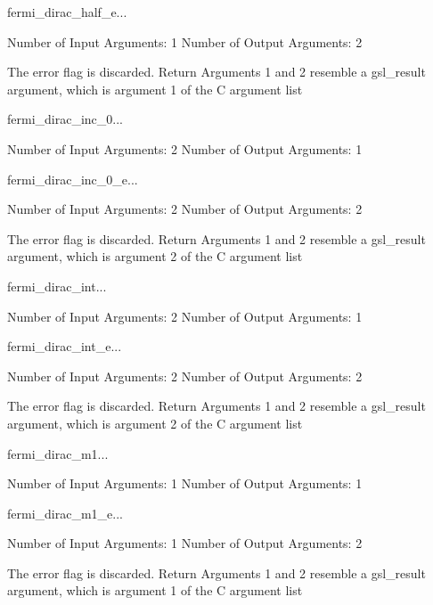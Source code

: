 \begin{funcdesc}{fermi_dirac_half_e}{...}

    Number of Input  Arguments:  1
    Number of Output Arguments:  2

The error flag is discarded.
Return Arguments 1 and 2 resemble a gsl_result argument,
	which is  argument 1 of the C argument list

\end{funcdesc}

\begin{funcdesc}{fermi_dirac_inc_0}{...}

    Number of Input  Arguments:  2
    Number of Output Arguments:  1
\end{funcdesc}

\begin{funcdesc}{fermi_dirac_inc_0_e}{...}

    Number of Input  Arguments:  2
    Number of Output Arguments:  2

The error flag is discarded.
Return Arguments 1 and 2 resemble a gsl_result argument,
	which is  argument 2 of the C argument list

\end{funcdesc}

\begin{funcdesc}{fermi_dirac_int}{...}

    Number of Input  Arguments:  2
    Number of Output Arguments:  1
\end{funcdesc}

\begin{funcdesc}{fermi_dirac_int_e}{...}

    Number of Input  Arguments:  2
    Number of Output Arguments:  2

The error flag is discarded.
Return Arguments 1 and 2 resemble a gsl_result argument,
	which is  argument 2 of the C argument list

\end{funcdesc}

\begin{funcdesc}{fermi_dirac_m1}{...}

    Number of Input  Arguments:  1
    Number of Output Arguments:  1
\end{funcdesc}

\begin{funcdesc}{fermi_dirac_m1_e}{...}

    Number of Input  Arguments:  1
    Number of Output Arguments:  2

The error flag is discarded.
Return Arguments 1 and 2 resemble a gsl_result argument,
	which is  argument 1 of the C argument list

\end{funcdesc}

